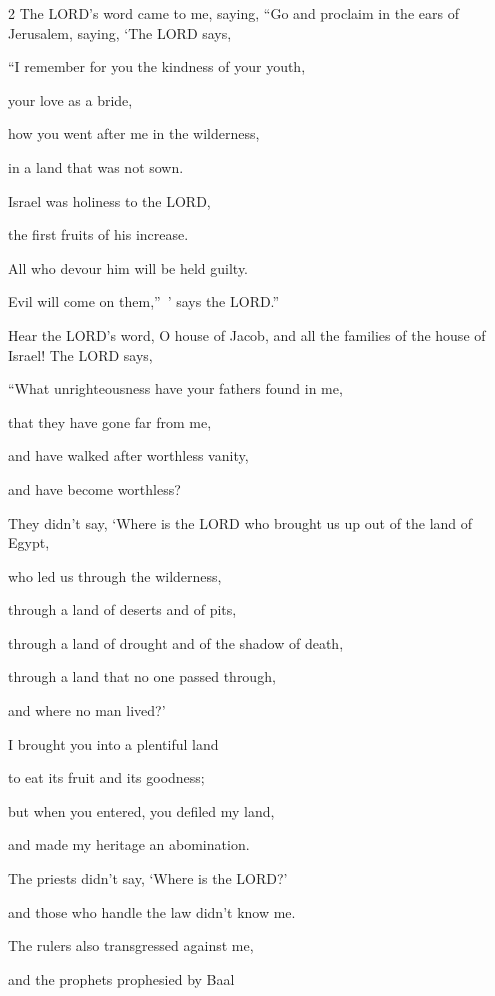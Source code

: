 \begin{multicols}{2}
	\mychapter{} \myverse*{}The LORD’s word came to me, saying, \myverse{}“Go and proclaim in the ears of Jerusalem, saying, ‘The LORD says,
	
	“I remember for you the kindness of your youth,
	
	your love as a bride,
	
	how you went after me in the wilderness,
	
	in a land that was not sown.
	
	
	\myverse{}Israel was holiness to the LORD,
	
	the first fruits of his increase.
	
	All who devour him will be held guilty.
	
	Evil will come on them,” ’ says the LORD.”
	
	\myverse{}Hear the LORD’s word, O house of Jacob, and all the families of
	the house of Israel! \myverse{}The LORD says,
	
	“What unrighteousness have your fathers found in me,
	
	that they have gone far from me,
	
	and have walked after worthless vanity,
	
	and have become worthless?
	
	
	\myverse{}They didn’t say, ‘Where is the LORD who brought us up out of the
	land of Egypt,
	
	who led us through the wilderness,
	
	through a land of deserts and of pits,
	
	through a land of drought and of the shadow of death,
	
	through a land that no one passed through,
	
	and where no man lived?’
	
	
	\myverse{}I brought you into a plentiful land
	
	to eat its fruit and its goodness;
	
	but when you entered, you defiled my land,
	
	and made my heritage an abomination.
	
	
	\myverse{}The priests didn’t say, ‘Where is the LORD?’
	
	and those who handle the law didn’t know me.
	
	The rulers also transgressed against me,
	
	and the prophets prophesied by Baal
	

\end{multicols}
